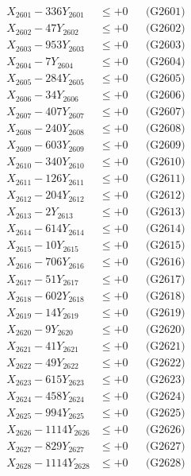 \documentclass[a4paper,10pt]{article}
\begin{document}
{\begin{align}
\allowbreak
X_{2601} - 336Y_{2601} &\leq +0 && \text{(G2601)} \\
X_{2602} - 47Y_{2602} &\leq +0 && \text{(G2602)} \\
X_{2603} - 953Y_{2603} &\leq +0 && \text{(G2603)} \\
X_{2604} - 7Y_{2604} &\leq +0 && \text{(G2604)} \\
X_{2605} - 284Y_{2605} &\leq +0 && \text{(G2605)} \\
X_{2606} - 34Y_{2606} &\leq +0 && \text{(G2606)} \\
X_{2607} - 407Y_{2607} &\leq +0 && \text{(G2607)} \\
X_{2608} - 240Y_{2608} &\leq +0 && \text{(G2608)} \\
X_{2609} - 603Y_{2609} &\leq +0 && \text{(G2609)} \\
X_{2610} - 340Y_{2610} &\leq +0 && \text{(G2610)} \\
\allowbreak
X_{2611} - 126Y_{2611} &\leq +0 && \text{(G2611)} \\
X_{2612} - 204Y_{2612} &\leq +0 && \text{(G2612)} \\
X_{2613} - 2Y_{2613} &\leq +0 && \text{(G2613)} \\
X_{2614} - 614Y_{2614} &\leq +0 && \text{(G2614)} \\
X_{2615} - 10Y_{2615} &\leq +0 && \text{(G2615)} \\
X_{2616} - 706Y_{2616} &\leq +0 && \text{(G2616)} \\
X_{2617} - 51Y_{2617} &\leq +0 && \text{(G2617)} \\
X_{2618} - 602Y_{2618} &\leq +0 && \text{(G2618)} \\
X_{2619} - 14Y_{2619} &\leq +0 && \text{(G2619)} \\
X_{2620} - 9Y_{2620} &\leq +0 && \text{(G2620)} \\
\allowbreak
X_{2621} - 41Y_{2621} &\leq +0 && \text{(G2621)} \\
X_{2622} - 49Y_{2622} &\leq +0 && \text{(G2622)} \\
X_{2623} - 615Y_{2623} &\leq +0 && \text{(G2623)} \\
X_{2624} - 458Y_{2624} &\leq +0 && \text{(G2624)} \\
X_{2625} - 994Y_{2625} &\leq +0 && \text{(G2625)} \\
X_{2626} - 1114Y_{2626} &\leq +0 && \text{(G2626)} \\
X_{2627} - 829Y_{2627} &\leq +0 && \text{(G2627)} \\
X_{2628} - 1114Y_{2628} &\leq +0 && \text{(G2628)} \\

\end{align}}
\end{document}
